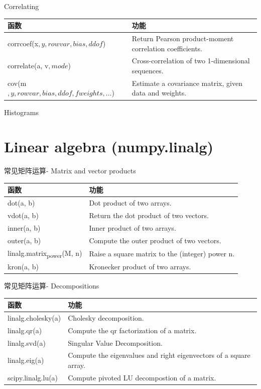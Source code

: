 \documentclass[ignorenonframetext,11pt,xcolor=dvipsnames,hyperref={colorlinks,allcolors=.,urlcolor=blue, citecolor=violet, bookmarksdepth=4},aspectratio=1610]{beamer}
\begin{document}
\begin{frame}{Correlating}
\protect\hypertarget{correlating}{}

\begin{longtable}[]{@{}ll@{}}
\toprule
函数 & 功能\tabularnewline
\midrule
\endhead
corrcoef(x\(, y, rowvar, bias, ddof\)) & Return Pearson product-moment
correlation coefficients.\tabularnewline
correlate(a, v\(, mode\)) & Cross-correlation of two 1-dimensional
sequences.\tabularnewline
cov(m\(, y, rowvar, bias, ddof, fweights, ...\)) & Estimate a covariance
matrix, given data and weights.\tabularnewline
\bottomrule
\end{longtable}

\end{frame}

\begin{frame}{Histograms}
\protect\hypertarget{histograms}{}

\end{frame}

\hypertarget{linear-algebra-numpy.linalg}{%
\section{Linear algebra
(numpy.linalg)}\label{linear-algebra-numpy.linalg}}

\begin{frame}{常见矩阵运算- Matrix and vector products}
\protect\hypertarget{matrix-and-vector-products}{}

\scriptsize

\begin{longtable}[]{@{}ll@{}}
\toprule
函数 & 功能\tabularnewline
\midrule
\endhead
dot(a, b) & Dot product of two arrays.\tabularnewline
vdot(a, b) & Return the dot product of two vectors.\tabularnewline
inner(a, b) & Inner product of two arrays.\tabularnewline
outer(a, b) & Compute the outer product of two vectors.\tabularnewline
linalg.matrix\textsubscript{power}(M, n) & Raise a square matrix to the
(integer) power n.\tabularnewline
kron(a, b) & Kronecker product of two arrays.\tabularnewline
\bottomrule
\end{longtable}

\end{frame}

\begin{frame}{常见矩阵运算- Decompositions}
\protect\hypertarget{decompositions}{}

\scriptsize

\begin{longtable}[]{@{}ll@{}}
\toprule
函数 & 功能\tabularnewline
\midrule
\endhead
linalg.cholesky(a) & Cholesky decomposition.\tabularnewline
linalg.qr(a) & Compute the qr factorization of a matrix.\tabularnewline
linalg.svd(a) & Singular Value Decomposition.\tabularnewline
linalg.eig(a) & Compute the eigenvalues and right eigenvectors of a
square array.\tabularnewline
scipy.linalg.lu(a) & Compute pivoted LU decompostion of a
matrix.\tabularnewline
\bottomrule
\end{longtable}

\end{frame}
\end{document}
